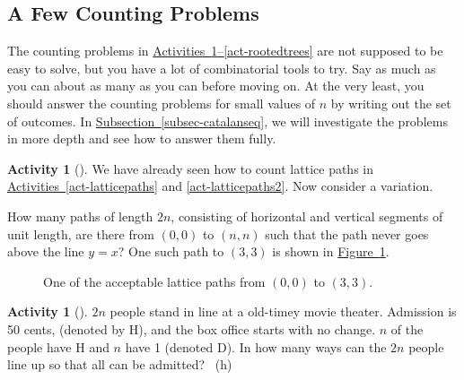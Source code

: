\documentclass[10pt,]{book}
\theoremstyle{plain}
\theoremstyle{definition}
\theoremstyle{definition}
\theoremstyle{definition}
\newtheorem{activity}[project]{Activity}
\numberwithin{equation}{chapter}
\begin{document}
\subsection[{A Few Counting Problems}]{A Few Counting Problems}\label{subsec-catalanprobs}
\hypertarget{p-988}{}%
The counting problems in \hyperref[act-lowerpaths]{Activities~\ref{act-lowerpaths}--\ref{act-rootedtrees}} are not supposed to be easy to solve, but you have a lot of combinatorial tools to try.  Say as much as you can about as many as you can before moving on.  At the very least, you should answer the counting problems for small values of \(n\) by writing out the set of outcomes.  In \hyperref[subsec-catalanseq]{Subsection~\ref{subsec-catalanseq}}, we will investigate the problems in more depth and see how to answer them fully.%
\begin{activity}[]\label{act-lowerpaths}
\hypertarget{p-989}{}%
We have already seen how to count lattice paths in \hyperref[act-latticepaths]{Activities~\ref{act-latticepaths}} and \hyperref[act-latticepaths2]{\ref{act-latticepaths2}}.  Now consider a variation.%
\par
\hypertarget{p-990}{}%
How many paths of length \(2n\), consisting of horizontal and vertical segments of unit length, are there from \((0, 0)\) to \((n, n)\) such that the path never goes above the line \(y = x\)? One such path to \((3, 3)\) is shown in \hyperref[catalanpathex]{Figure~\ref{catalanpathex}}.%
\begin{figure}
\centering
{
}
\caption{One of the acceptable lattice paths from \((0,0)\) to \((3,3)\).\label{catalanpathex}}
\end{figure}
\end{activity}
\begin{activity}[]\label{act-hdseq}
\hypertarget{p-992}{}%
\(2n\) people stand in line at a old-timey movie theater. Admission is 50 cents, (denoted by H), and the box office starts with no change. \(n\) of the people have H and \(n\) have \textdollar{}1 (denoted D). In how many ways can the \(2n\) people line up so that all can be admitted?%
~{\tiny (h)}\end{activity}
\end{document}
